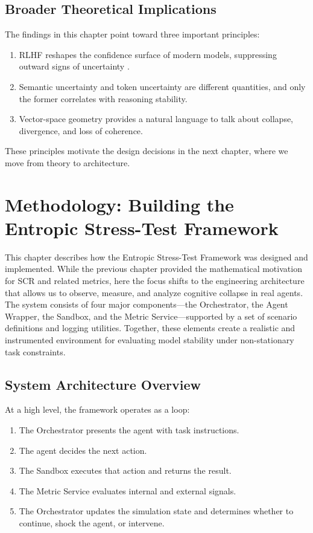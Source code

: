 \documentclass[12pt,a4paper]{report}
\begin{document}
\section{Broader Theoretical Implications}
The findings in this chapter point toward three important principles:
\begin{enumerate}
    \item RLHF reshapes the confidence surface of modern models, suppressing outward signs of uncertainty \cite{Chen2025Overconfidence, Perez2022Discovering, Perez2024Mislead}.
    \item Semantic uncertainty and token uncertainty are different quantities, and only the former correlates with reasoning stability.
    \item Vector-space geometry provides a natural language to talk about collapse, divergence, and loss of coherence.
\end{enumerate}

These principles motivate the design decisions in the next chapter, where we move from theory to architecture.

\chapter{Methodology: Building the Entropic Stress-Test Framework}

This chapter describes how the Entropic Stress-Test Framework was designed and implemented. While the previous chapter provided the mathematical motivation for SCR and related metrics, here the focus shifts to the engineering architecture that allows us to observe, measure, and analyze cognitive collapse in real agents. The system consists of four major components—the Orchestrator, the Agent Wrapper, the Sandbox, and the Metric Service—supported by a set of scenario definitions and logging utilities. Together, these elements create a realistic and instrumented environment for evaluating model stability under non-stationary task constraints.

\section{System Architecture Overview}
At a high level, the framework operates as a loop:
\begin{enumerate}
    \item The Orchestrator presents the agent with task instructions.
    \item The agent decides the next action.
    \item The Sandbox executes that action and returns the result.
    \item The Metric Service evaluates internal and external signals.
    \item The Orchestrator updates the simulation state and determines whether to continue, shock the agent, or intervene.
\end{enumerate}
\end{document}
